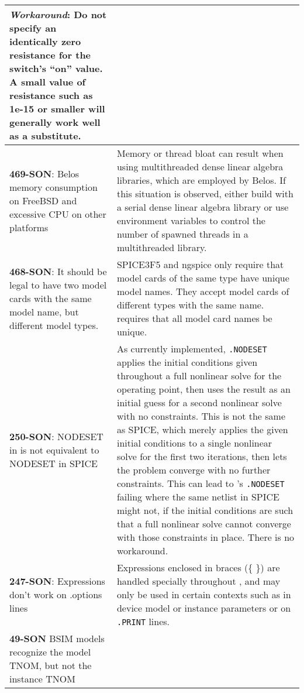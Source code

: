 {\begin{longtable}[h] {>{\raggedright\small}m{2in}|>{\raggedright\let\\\tabularnewline\small}m{3.5in}}
\textbf{\textit{Workaround}}: Do not specify an identically zero resistance for the switch's ``on'' value.  A small value of resistance such as 1e-15 or smaller will generally work well as a substitute. \\ \hline


\textbf{469-SON}: Belos memory consumption on FreeBSD and excessive CPU on other
platforms &
Memory or thread bloat can result when using multithreaded dense linear algebra
libraries, which are employed by Belos.  If this situation is observed, either build
\Xyce{} with a serial dense linear algebra library or use environment variables to control
the number of spawned threads in a multithreaded library.
\\ \hline


\textbf{468-SON}: It should be legal to have two model cards with the same model
name, but different model types. & SPICE3F5 and ngspice only require that
model cards of the same type have unique model names. They accept model cards
of different types with the same name.  \Xyce{} requires that all model card names be unique.
\\ \hline


\textbf{250-SON}: NODESET in \Xyce{} is not equivalent to NODESET in SPICE & As
currently implemented, \texttt{.NODESET} applies the initial conditions given throughout
a full nonlinear solve for the operating point, then uses the result as an
initial guess for a second nonlinear solve with no constraints.  This is not
the same as SPICE, which merely applies the given initial conditions to a
single nonlinear solve for the first two iterations, then lets the problem
converge with no further constraints.  This can lead to \Xyce{}'s \texttt{.NODESET} failing
where the same netlist in SPICE might not, if the initial conditions are such
that a full nonlinear solve cannot converge with those constraints in place.
There is no workaround.
\\ \hline

\textbf{247-SON}: Expressions don't work on .options lines & Expressions enclosed
in braces (\{ \}) are handled specially throughout \Xyce{}, and may only be used
in certain contexts such as in device model or instance parameters or on
\texttt{.PRINT} lines.
\\ \hline


\textbf{49-SON} \Xyce{} BSIM models recognize the model TNOM, but not the
instance TNOM & 
\\ \hline


\end{longtable}}
